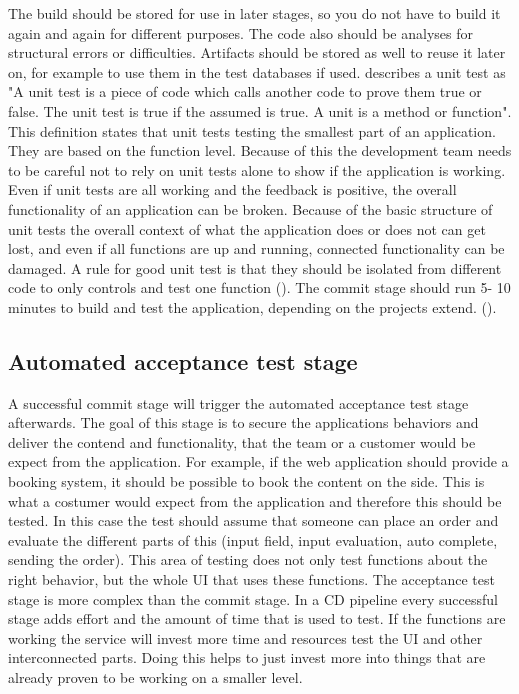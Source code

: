 The build should be stored for use in later stages, so you do not have to build it again and again for different purposes.
The code also should be analyses for structural errors or difficulties. Artifacts should be stored as well to reuse it later on, for example to use them in
the test databases if used. \cite{osherove2015art}
describes a unit test as "A unit test is a piece of code which calls another code to prove them true or false. The unit test is true if the assumed is true.
A unit is a method or function". This definition states that unit tests testing the smallest part of an application. They are based on the function level.
Because of this the development team needs to be careful not to rely on unit tests alone to show if the application is working. Even if unit tests are all
working and the feedback is positive, the overall functionality of an application can be broken. Because of the basic structure of unit tests the
overall context of what the application does or does not can get lost, and even if all functions are up and running, connected functionality can be damaged.
A rule for good unit test is that they should be isolated from different code to only controls and test one function (\cite{osherove2015art}).
The commit stage should run 5- 10 minutes to build and test the application, depending on the projects extend. (\cite{humble2010continuous}).

\subsection{Automated acceptance test stage}
A successful commit stage will trigger the automated acceptance test stage afterwards. The goal of this stage is to secure the applications behaviors and
deliver the contend and functionality, that the team or a customer would be expect from the application. For example, if the web application should provide a
booking system, it should be possible to book the content on the side. This is what a costumer would expect from the application and therefore this should be
tested. In this case the test should assume that someone can place an order and evaluate the different parts of this (input field, input evaluation, auto
complete, sending the order). This area of testing does not only test functions about the right behavior, but the whole UI that uses these functions.
The acceptance test stage is more complex than the commit stage. In a CD pipeline every successful stage adds effort and the amount of time that is used to test.
If the functions are working the service will invest more time and resources test the UI and other interconnected parts. Doing this helps to just invest more
into things that are already proven to be working on a smaller level.

